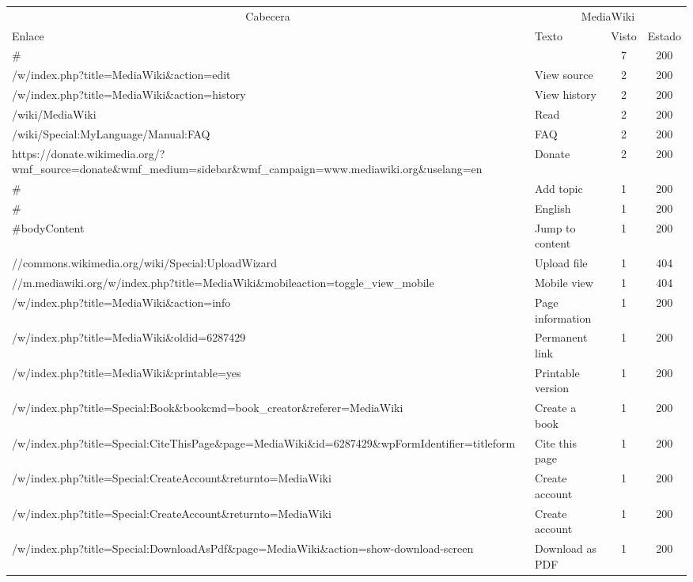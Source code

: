\documentclass[
]{article}
\begin{document}
\begin{table}
\centering
\begin{tabular}[t]{l|l|c|c}
\hline
\multicolumn{1}{c|}{Cabecera} & \multicolumn{3}{c}{MediaWiki} \\
\cline{1-1} \cline{2-4}
Enlace & Texto & Visto & Estado\\
\hline
\# &  & 7 & 200\\
\hline
/w/index.php?title=MediaWiki\&action=edit & View source & 2 & 200\\
\hline
/w/index.php?title=MediaWiki\&action=history & View history & 2 & 200\\
\hline
/wiki/MediaWiki & Read & 2 & 200\\
\hline
/wiki/Special:MyLanguage/Manual:FAQ & FAQ & 2 & 200\\
\hline
https://donate.wikimedia.org/?wmf\_source=donate\&wmf\_medium=sidebar\&wmf\_campaign=www.mediawiki.org\&uselang=en & Donate & 2 & 200\\
\hline
\# & Add topic & 1 & 200\\
\hline
\# & English & 1 & 200\\
\hline
\#bodyContent & Jump to content & 1 & 200\\
\hline
//commons.wikimedia.org/wiki/Special:UploadWizard & Upload file & 1 & 404\\
\hline
//m.mediawiki.org/w/index.php?title=MediaWiki\&mobileaction=toggle\_view\_mobile & Mobile view & 1 & 404\\
\hline
/w/index.php?title=MediaWiki\&action=info & Page information & 1 & 200\\
\hline
/w/index.php?title=MediaWiki\&oldid=6287429 & Permanent link & 1 & 200\\
\hline
/w/index.php?title=MediaWiki\&printable=yes & Printable version & 1 & 200\\
\hline
/w/index.php?title=Special:Book\&bookcmd=book\_creator\&referer=MediaWiki & Create a book & 1 & 200\\
\hline
/w/index.php?title=Special:CiteThisPage\&page=MediaWiki\&id=6287429\&wpFormIdentifier=titleform & Cite this page & 1 & 200\\
\hline
/w/index.php?title=Special:CreateAccount\&returnto=MediaWiki & Create account & 1 & 200\\
\hline
/w/index.php?title=Special:CreateAccount\&returnto=MediaWiki & Create account & 1 & 200\\
\hline
/w/index.php?title=Special:DownloadAsPdf\&page=MediaWiki\&action=show-download-screen & Download as PDF & 1 & 200\\

\end{tabular}
\end{table}
\end{document}
